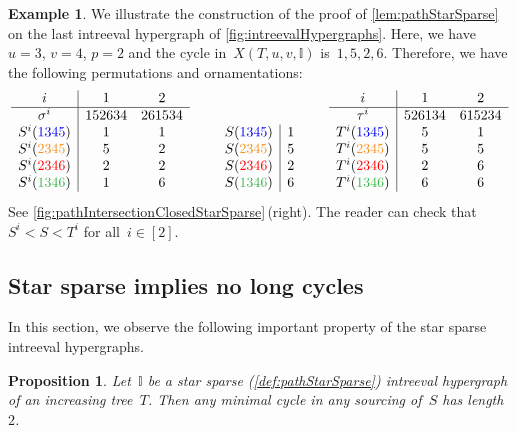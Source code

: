 \documentclass{amsart}
\newtheorem{proposition}[theorem]{Proposition}
\theoremstyle{definition}
\newtheorem{example}[theorem]{Example}
\newcommand{\blue}[1]{{\color{blue} #1}} %
\newcommand{\red}[1]{{\color{red} #1}} %
\newcommand{\green}[1]{{\color{green} #1}} %
\newcommand{\orange}[1]{{\color{orange} #1}} %
\newcommand{\II}{\mathbb I} %
\begin{document}
\begin{example}
\label{exm:pathStarSparse}
We illustrate the construction of the proof of \cref{lem:pathStarSparse} on the last intreeval hypergraph of \cref{fig:intreevalHypergraphs}.
Here, we have~$u = 3$, $v = 4$, $p = 2$ and the cycle in~$X(T, u, v, \II)$ is~$1, 5, 2, 6$.
Therefore, we have the following permutations and ornamentations:
\[
\begin{array}[b]{c|cc}
	i & 1 & 2 \\ 
	\hline
	\sigma^i & 152634 & 261534 \\
	S^i(\blue{1345}) & 1 & 1 \\
	S^i(\orange{2345}) & 5 & 2 \\
	S^i(\red{2346}) & 2 & 2 \\
	S^i(\green{1346}) & 1 & 6 \\
\end{array}
\qquad
\begin{array}[b]{c|c}
	S(\blue{1345}) & 1 \\
	S(\orange{2345}) & 5 \\
	S(\red{2346}) & 2 \\
	S(\green{1346}) & 6 \\
\end{array}
\qquad
\begin{array}[b]{c|cc}
	i & 1 & 2 \\ 
	\hline
	\tau^i & 526134 & 615234 \\
	T^i(\blue{1345}) & 5 & 1 \\
	T^i(\orange{2345}) & 5 & 5 \\
	T^i(\red{2346}) & 2 & 6 \\
	T^i(\green{1346}) & 6 & 6 \\
\end{array}
\]
See \cref{fig:pathIntersectionClosedStarSparse}\,(right).
The reader can check that~$S^i < S < T^i$ for all~$i \in [2]$.
\end{example}


\subsection{Star sparse implies no long cycles}
\label{subsec:shortCycles}

In this section, we observe the following important property of the star sparse intreeval hypergraphs.

\begin{proposition}
\label{prop:pathStarSparse}
Let~$\II$ be a star sparse (\cref{def:pathStarSparse}) intreeval hypergraph of an increasing tree~$T$.
Then any minimal cycle in any sourcing of~$S$ has length~$2$.
\end{proposition}
\end{document}
